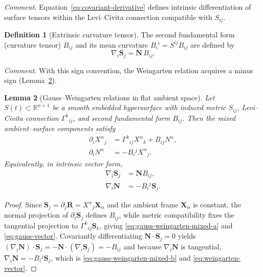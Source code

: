 \documentclass[11pt]{article}
\theoremstyle{definition}
\newtheorem{definition}{Definition}[section]
\theoremstyle{plain}
\newtheorem{lemma}[definition]{Lemma}
\theoremstyle{remark}
\begin{document}
\noindent\emph{Comment.}
Equation~\eqref{eq:covariant-derivative} defines intrinsic differentiation of surface tensors within the Levi–Civita connection compatible with $S_{ij}$.

\begin{definition}[Extrinsic curvature tensor]\label{def:curvature}
The second fundamental form (curvature tensor) $B_{ij}$ and its mean curvature $B_i{}^{i}=S^{ij}B_{ij}$ are defined by
\begin{equation}\label{eq:second-form}
\nabla_i \mathbf{S}_j = \mathbf{N}\,B_{ij}.
\end{equation}
\end{definition}

\noindent\emph{Comment.}
With this sign convention, the Weingarten relation acquires a minus sign (Lemma~\ref{lem:weingarten}).

\begin{lemma}[Gauss--Weingarten relations in flat ambient space]\label{lem:weingarten}
Let $S(t)\subset\mathbb{R}^{n+1}$ be a smooth embedded hypersurface with induced metric $S_{ij}$, Levi--Civita connection $\Gamma^{k}{}_{ij}$, and second fundamental form $B_{ij}$. Then the mixed ambient–surface components satisfy
\begin{align}
\partial_i X^{\alpha}{}_{j} &= \Gamma^{k}{}_{ij} X^{\alpha}{}_{k} + B_{ij} N^{\alpha}, \label{eq:gauss-weingarten-mixed-a}\\
\partial_i N^{\alpha} &= -B_i{}^{j} X^{\alpha}{}_{j}. \label{eq:gauss-weingarten-mixed-b}
\end{align}
Equivalently, in intrinsic vector form,
\begin{align}
\nabla_i \mathbf{S}_j &= \mathbf{N} B_{ij}, \label{eq:gauss-vector}\\
\nabla_i \mathbf{N} &= - B_i{}^{j} \mathbf{S}_j. \label{eq:weingarten-vector}
\end{align}
\end{lemma}

\begin{proof}
Since $\mathbf{S}_j=\partial_j\mathbf{R}=X^{\alpha}{}_{j}\mathbf{X}_{\alpha}$ and the ambient frame $\mathbf{X}_{\alpha}$ is constant, the normal projection of $\partial_i\mathbf{S}_j$ defines $B_{ij}$, while metric compatibility fixes the tangential projection to $\Gamma^{k}{}_{ij}\mathbf{S}_k$, giving \eqref{eq:gauss-weingarten-mixed-a} and \eqref{eq:gauss-vector}. Covariantly differentiating $\mathbf{N}\cdot\mathbf{S}_j=0$ yields $(\nabla_i\mathbf{N})\cdot\mathbf{S}_j=-\mathbf{N}\cdot(\nabla_i\mathbf{S}_j)=-B_{ij}$ and because $\nabla_i\mathbf{N}$ is tangential, $\nabla_i\mathbf{N}=-B_i{}^{j}\mathbf{S}_j$, which is \eqref{eq:gauss-weingarten-mixed-b} and \eqref{eq:weingarten-vector}.
\end{proof}
\end{document}
